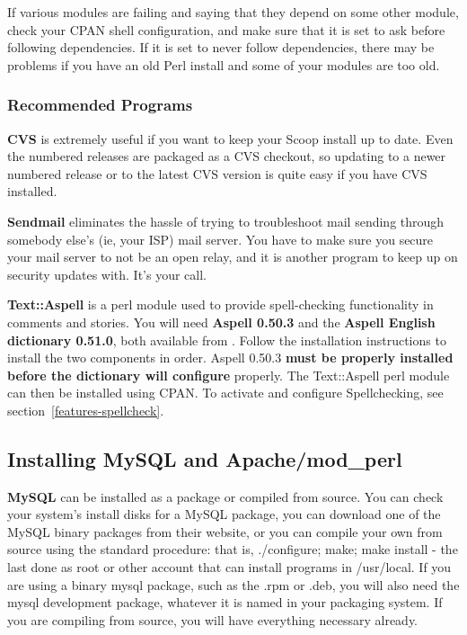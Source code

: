 If various modules are failing and saying that they depend on some other module, check your CPAN shell configuration, and make sure that it is set to ask before following dependencies.  If it is set to never follow dependencies, there may be problems if you have an old Perl install and some of your modules are too old.

\subsubsection{Recommended Programs}
\label{install-recommended-programs}

{\bf CVS} is extremely useful if you want to keep your Scoop install up to date.  Even the numbered releases are packaged as a CVS checkout, so updating to a newer numbered release or to the latest CVS version is quite easy if you have CVS installed.

{\bf Sendmail} eliminates the hassle of trying to troubleshoot mail sending through somebody else's (ie, your ISP) mail server.  You have to make sure you secure your mail server to not be an open relay, and it is another program to keep up on security updates with.  It's your call.

{\bf Text::Aspell} is a perl module used to provide spell-checking functionality in comments and stories.  You will need {\bf Aspell 0.50.3} and the {\bf Aspell English dictionary 0.51.0}, both available from .  Follow the installation instructions to install the two components in order.  Aspell 0.50.3 {\bf must be properly installed before the dictionary will configure} properly.  The Text::Aspell perl module can then be installed using CPAN.  To activate and configure Spellchecking, see section~\ref{features-spellcheck}.

\subsection{Installing MySQL and Apache/mod\_perl}
\label{install-apache-modperl}

{\bf MySQL} can be installed as a package or compiled from source.  You can check your system's install disks for a MySQL package, you can download one of the MySQL binary packages from their website, or you can compile your own from source using the standard procedure: that is, ./configure; make; make install - the last done as root or other account that can install programs in /usr/local.  If you are using a binary mysql package, such as the .rpm or .deb, you will also need the mysql development package, whatever it is named in your packaging system.  If you are compiling from source, you will have everything necessary already.

